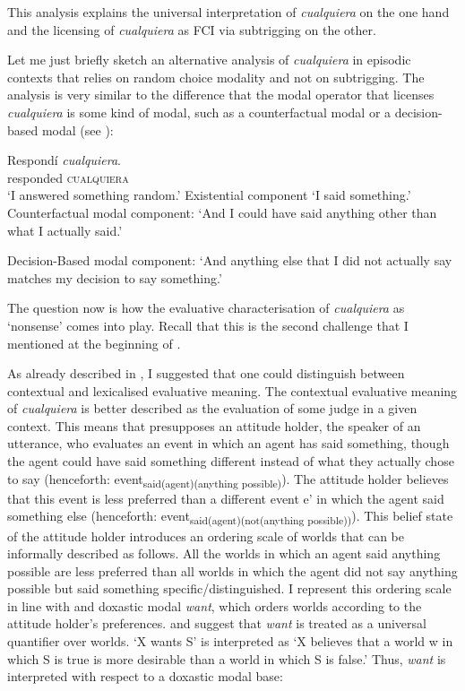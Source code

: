 This analysis explains the universal interpretation of \textit{cualquiera} on the one hand and the licensing of \textit{cualquiera} as FCI via subtrigging on the other.

Let me just briefly sketch an alternative analysis of \textit{cualquiera} in episodic contexts that relies on random choice modality and not on subtrigging. The analysis is very similar to the difference that the modal operator that licenses \textit{cualquiera} is some kind of modal, such as a counterfactual modal or a decision-based modal (see ):

\ea
\label{bkm:Ref150787301} %
\ea \label{bkm:Ref150787301-1}
\gll Respondí \textit{cualquiera}.\\
responded \textsc{cualquiera}\\
\glt ‘I answered something random.’
\ex \label{bkm:Ref150787301-2} Existential component
‘I said something.’
\ex \label{bkm:Ref150787301-3} Counterfactual modal component: ‘And I could have said anything other than what I actually said.’

Decision-Based modal component: ‘And anything else that I did not actually say matches my decision to say something.’
\z
\z

The question now is how the evaluative characterisation of \textit{cualquiera} as ‘nonsense’ comes into play. Recall that this is the second challenge that I mentioned at the beginning of .

As already described in , I suggested that one could distinguish between contextual and lexicalised evaluative meaning. The contextual evaluative meaning of \textit{cualquiera} is better described as the evaluation of some judge in a given context. This means that  presupposes an attitude holder, the speaker of an utterance, who evaluates an event in which an agent has said something, though the agent could have said something different instead of what they actually chose to say (henceforth: event\textsubscript{said(agent)(anything possible)}). The attitude holder believes that this event is less preferred than a different event e' in which the agent said something else (henceforth: event\textsubscript{said(agent)(not(anything possible))}). This belief state of the attitude holder introduces an ordering scale of worlds that can be informally described as follows. All the worlds in which an agent said anything possible are less preferred than all worlds in which the agent did not say anything possible but said something specific/distinguished. I represent this ordering scale in line with \citet{Stalnaker1984} and  doxastic modal \textit{want}, which orders worlds according to the attitude holder’s preferences. \citet{Stalnaker1984} and \citet{Heim1982} suggest that \textit{want} is treated as a universal quantifier over worlds. ‘X wants S’ is interpreted as ‘X believes that a world w in which S is true is more desirable than a world in which S is false.’ Thus, \textit{want} is interpreted with respect to a doxastic modal base:

